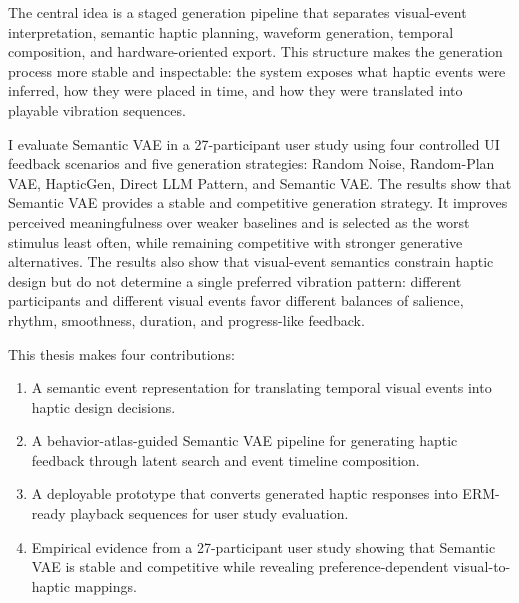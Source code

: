 The central idea is a staged generation pipeline that separates visual-event interpretation, semantic haptic planning, waveform generation, temporal composition, and hardware-oriented export. This structure makes the generation process more stable and inspectable: the system exposes what haptic events were inferred, how they were placed in time, and how they were translated into playable vibration sequences.

I evaluate Semantic VAE in a 27-participant user study using four controlled UI feedback scenarios and five generation strategies: Random Noise, Random-Plan VAE, HapticGen, Direct LLM Pattern, and Semantic VAE. The results show that Semantic VAE provides a stable and competitive generation strategy. It improves perceived meaningfulness over weaker baselines and is selected as the worst stimulus least often, while remaining competitive with stronger generative alternatives. The results also show that visual-event semantics constrain haptic design but do not determine a single preferred vibration pattern: different participants and different visual events favor different balances of salience, rhythm, smoothness, duration, and progress-like feedback.

This thesis makes four contributions:

\begin{enumerate}
    \item A semantic event representation for translating temporal visual events into haptic design decisions.
    \item A behavior-atlas-guided Semantic VAE pipeline for generating haptic feedback through latent search and event timeline composition.
    \item A deployable prototype that converts generated haptic responses into ERM-ready playback sequences for user study evaluation.
    \item Empirical evidence from a 27-participant user study showing that Semantic VAE is stable and competitive while revealing preference-dependent visual-to-haptic mappings.
\end{enumerate}
